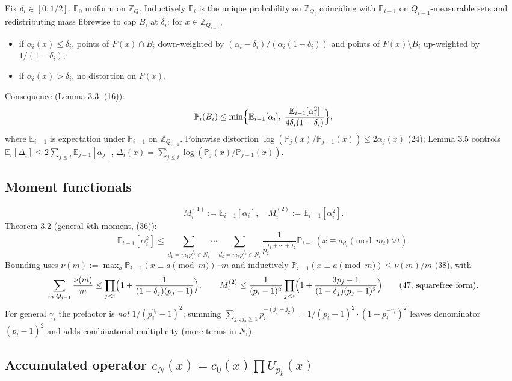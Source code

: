 \documentclass[11pt,a4paper]{article}
\theoremstyle{plain}
\theoremstyle{definition}
\theoremstyle{remark}
\newcommand{\Z}{\mathbb{Z}}
\newcommand{\PP}{\mathbb{P}}
\newcommand{\E}{\mathbb{E}}
\newcommand{\cN}{c_{N}}
\newcommand{\cO}{c_{0}}
\begin{document}
Fix $\delta_{i}\in[0,1/2]$. $\PP_{0}$ uniform on $\Z_{Q}$. Inductively $\PP_{i}$ is the unique probability on $\Z_{Q_{i}}$ coinciding with $\PP_{i-1}$ on $Q_{i-1}$-measurable sets and redistributing mass fibrewise to cap $B_{i}$ at $\delta_{i}$: for $x\in\Z_{Q_{i-1}}$,
\begin{itemize}
\item if $\alpha_{i}(x)\le\delta_{i}$, points of $F(x)\cap B_{i}$ down-weighted by $(\alpha_{i}-\delta_{i})/(\alpha_{i}(1-\delta_{i}))$ and points of $F(x)\setminus B_{i}$ up-weighted by $1/(1-\delta_{i})$;
\item if $\alpha_{i}(x)>\delta_{i}$, no distortion on $F(x)$.
\end{itemize}
Consequence (Lemma 3.3, (16)):
\[
\PP_{i}(B_{i})\le\min\Bigl\{\E_{i-1}[\alpha_{i}],\;\frac{\E_{i-1}[\alpha_{i}^{2}]}{4\delta_{i}(1-\delta_{i})}\Bigr\},
\]
where $\E_{i-1}$ is expectation under $\PP_{i-1}$ on $\Z_{Q_{i-1}}$. Pointwise distortion $\log(\PP_{j}(x)/\PP_{j-1}(x))\le2\alpha_{j}(x)$ (24); Lemma 3.5 controls $\E_{i}[\Delta_{i}]\le2\sum_{j\le i}\E_{j-1}[\alpha_{j}]$, $\Delta_{i}(x)=\sum_{j\le i}\log(\PP_{j}(x)/\PP_{j-1}(x))$.

\subsection{Moment functionals}

\[
M_{i}^{(1)}:=\E_{i-1}[\alpha_{i}],\quad M_{i}^{(2)}:=\E_{i-1}[\alpha_{i}^{2}]\tag{13}.
\]
Theorem 3.2 (general $k$th moment, (36)):
\[
\E_{i-1}[\alpha_{i}^{k}]\le\sum_{d_{1}=m_{1}p_{i}^{j_{1}}\in N_{i}}\!\!\cdots\!\!\sum_{d_{k}=m_{k}p_{i}^{j_{k}}\in N_{i}}\frac1{p_{i}^{j_{1}+\cdots+j_{k}}}\PP_{i-1}(x\equiv a_{d_{t}}\pmod{m_{t}}\;\forall t).
\]
Bounding uses $\nu(m):=\max_{a}\PP_{i-1}(x\equiv a\pmod m)\cdot m$ and inductively $\PP_{i-1}(x\equiv a\pmod m)\le\nu(m)/m$ (38), with
\[
\sum_{m\mid Q_{i-1}}\frac{\nu(m)}{m}\le\prod_{j<i}\Bigl(1+\frac1{(1-\delta_{j})(p_{j}-1)}\Bigr),\qquad
M_{i}^{(2)}\le\frac1{(p_{i}-1)^{2}}\prod_{j<i}\Bigl(1+\frac{3p_{j}-1}{(1-\delta_{j})(p_{j}-1)^{2}}\Bigr)\tag{47, squarefree form}.
\]
For general $\gamma_{i}$ the prefactor is \emph{not} $1/(p_{i}^{\gamma_{i}}-1)^{2}$; summing $\sum_{j_{1},j_{2}\ge1}p_{i}^{-(j_{1}+j_{2})}=1/(p_{i}-1)^{2}\cdot(1-p_{i}^{-\gamma_{i}})^{2}$ leaves denominator $(p_{i}-1)^{2}$ and adds combinatorial multiplicity (more terms in $N_{i}$).

\subsection{Accumulated operator \texorpdfstring{$\cN(x)=\cO(x)\prod U_{p_{k}}(x)$}{N(x)=O(x) prod U\_pk(x)}}
\end{document}
